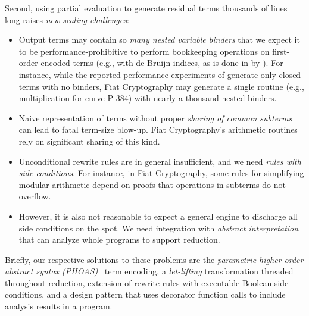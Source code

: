 Second, using partial evaluation to generate residual terms thousands of lines long raises \emph{new scaling challenges}:
\begin{itemize}
\item
  Output terms may contain so \emph{many nested variable binders} that we expect it to be performance-prohibitive to perform bookkeeping operations on first-order-encoded terms (e.g., with de Bruijn indices, as is done in \Rtac{} by \textcite{rtac}).
  For instance, while the reported performance experiments of \textcite{Aehlig} generate only closed terms with no binders, Fiat Cryptography may generate a single routine (e.g., multiplication for curve P-384) with nearly a thousand nested binders.
\item
  Naive representation of terms without proper \emph{sharing of common subterms} can lead to fatal term-size blow-up.
  Fiat Cryptography's arithmetic routines rely on significant sharing of this kind.
\item
  Unconditional rewrite rules are in general insufficient, and we need \emph{rules with side conditions}.
  For instance, in Fiat Cryptography, some rules for simplifying modular arithmetic depend on proofs that operations in subterms do not overflow.
\item
  However, it is also not reasonable to expect a general engine to discharge all side conditions on the spot.
  We need integration with \emph{abstract interpretation} that can analyze whole programs to support reduction.
\end{itemize}

Briefly, our respective solutions to these problems are the \emph{parametric higher-order abstract syntax (PHOAS)}~\cite{PhoasICFP08} term encoding, a \emph{let-lifting} transformation threaded throughout reduction, extension of rewrite rules with executable Boolean side conditions, and a design pattern that uses decorator function calls to include analysis results in a program.

